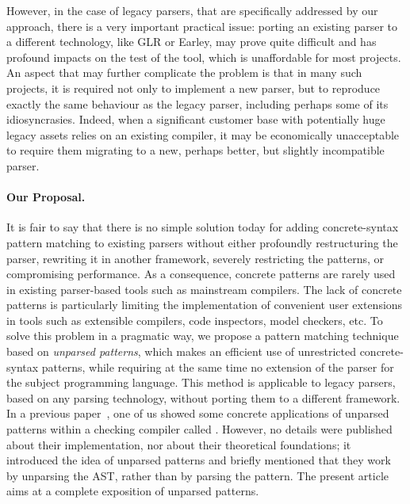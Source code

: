 However, in the case of legacy parsers, that are specifically
addressed by our approach, there is a very important practical issue:
porting an existing parser to a different technology, like GLR or
Earley, may prove quite difficult and has profound impacts on the test
of the tool, which is unaffordable for most projects. An aspect that
may further complicate the problem is that in many such projects, it
is required not only to implement a new parser, but to reproduce
exactly the same behaviour as the legacy parser, including perhaps
some of its idiosyncrasies. Indeed, when a significant customer base
with potentially huge legacy assets relies on an existing compiler, it
may be economically unacceptable to require them migrating to a new,
perhaps better, but slightly incompatible parser.

\paragraph{Our Proposal.}

It is fair to say that there is no simple solution today for adding
concrete\hyp{}syntax pattern matching to existing parsers without
either profoundly re\-structuring the parser, rewriting it in another
framework, severe\-ly restricting the patterns, or compromising
performance. As a consequence, concrete patterns are rarely used in
existing parser\hyp{}based tools such as mainstream compilers. The
lack of concrete patterns is particularly limiting the implementation
of convenient user extensions in tools such as extensible compilers,
code inspectors, model checkers, etc. To solve this problem in a
pragmatic way, we propose a pattern matching technique based on
\emph{unparsed patterns}, which makes an efficient use of unrestricted
concrete\hyp{}syntax patterns, while requiring at the same time no
extension of the parser for the subject programming language. This
method is applicable to legacy parsers, based on any parsing
technology, without porting them to a different framework. In a
previous paper~\cite{ppdp}, one of us showed some concrete
applications of unparsed patterns within a checking compiler called
\MyGCC. However, no details were published about their implementation,
nor about their theoretical foundations; it introduced the idea of
unparsed patterns and briefly mentioned that they work by unparsing
the AST, rather than by parsing the pattern. The present article aims
at a complete exposition of unparsed patterns.

